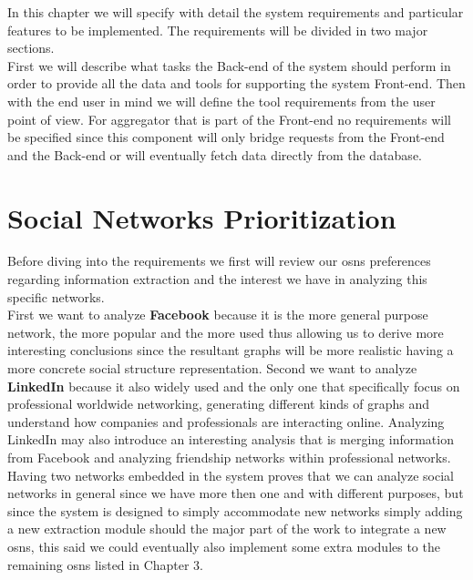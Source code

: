 In this chapter we will specify with detail the system requirements and particular features to be implemented. The requirements
will be divided in two major sections.\\
\indent First we will describe what tasks the Back-end of the system should perform in order to provide
all the data and tools for supporting the system Front-end. Then with the end user in mind we will define the tool requirements from
the user point of view. For aggregator that is part of the Front-end no requirements will be specified since this component will only bridge
requests from the Front-end and the Back-end or will eventually fetch data directly from the database.

\section{Social Networks Prioritization}
Before diving into the requirements we first will review our \glspl{osn} preferences regarding information extraction and the
interest we have in analyzing this specific networks.\\
\indent First we want to analyze \textbf{Facebook} because it is the more general purpose network, the more popular and the more used
thus allowing us to derive more interesting conclusions since the resultant graphs will be more realistic having a more concrete social structure
representation. Second we want to analyze \textbf{LinkedIn} because it also widely used and the only one that specifically
focus on professional worldwide networking, generating different kinds of graphs and understand how companies and professionals
are interacting online. Analyzing LinkedIn may also introduce an interesting analysis that is merging information from Facebook and
analyzing friendship networks within professional networks.\\
\indent Having two networks embedded in the system proves that we can analyze social networks in general since we have more
then one and with different purposes, but since the system is designed to simply accommodate new networks simply adding
a new extraction module should the major part of the work to integrate a new \glspl{osn}, this said we could eventually
also implement some extra modules to the remaining \glspl{osn} listed in Chapter 3.




